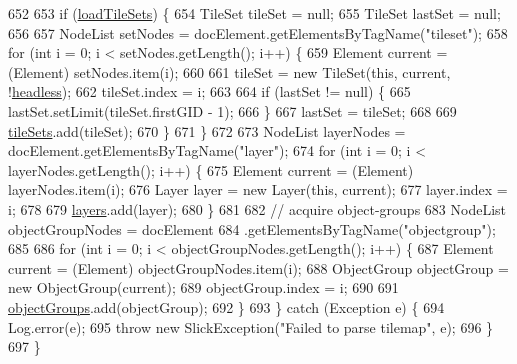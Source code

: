 \begin{DoxyCode}
652 
653             \textcolor{keywordflow}{if} (\mbox{\hyperlink{classorg_1_1newdawn_1_1slick_1_1tiled_1_1_tiled_map_a49356f102a76e7845f6dfbd4c6b70b59}{loadTileSets}}) \{
654                 TileSet tileSet = null;
655                 TileSet lastSet = null;
656 
657                 NodeList setNodes = docElement.getElementsByTagName(\textcolor{stringliteral}{"tileset"});
658                 \textcolor{keywordflow}{for} (\textcolor{keywordtype}{int} i = 0; i < setNodes.getLength(); i++) \{
659                     Element current = (Element) setNodes.item(i);
660 
661                     tileSet = \textcolor{keyword}{new} TileSet(\textcolor{keyword}{this}, current, !\mbox{\hyperlink{classorg_1_1newdawn_1_1slick_1_1tiled_1_1_tiled_map_aebbb5f7e7df93bc341d03b8bb55a2481}{headless}});
662                     tileSet.index = i;
663 
664                     \textcolor{keywordflow}{if} (lastSet != null) \{
665                         lastSet.setLimit(tileSet.firstGID - 1);
666                     \}
667                     lastSet = tileSet;
668 
669                     \mbox{\hyperlink{classorg_1_1newdawn_1_1slick_1_1tiled_1_1_tiled_map_a4fd72e23a7aaf6f85905f4bf78e2ce5f}{tileSets}}.add(tileSet);
670                 \}
671             \}
672 
673             NodeList layerNodes = docElement.getElementsByTagName(\textcolor{stringliteral}{"layer"});
674             \textcolor{keywordflow}{for} (\textcolor{keywordtype}{int} i = 0; i < layerNodes.getLength(); i++) \{
675                 Element current = (Element) layerNodes.item(i);
676                 Layer layer = \textcolor{keyword}{new} Layer(\textcolor{keyword}{this}, current);
677                 layer.index = i;
678 
679                 \mbox{\hyperlink{classorg_1_1newdawn_1_1slick_1_1tiled_1_1_tiled_map_a33061324d017a4cd8f41d04e0c60ac27}{layers}}.add(layer);
680             \}
681 
682             \textcolor{comment}{// acquire object-groups}
683             NodeList objectGroupNodes = docElement
684                     .getElementsByTagName(\textcolor{stringliteral}{"objectgroup"});
685 
686             \textcolor{keywordflow}{for} (\textcolor{keywordtype}{int} i = 0; i < objectGroupNodes.getLength(); i++) \{
687                 Element current = (Element) objectGroupNodes.item(i);
688                 ObjectGroup objectGroup = \textcolor{keyword}{new} ObjectGroup(current);
689                 objectGroup.index = i;
690 
691                 \mbox{\hyperlink{classorg_1_1newdawn_1_1slick_1_1tiled_1_1_tiled_map_aa446ef4b07ea80ab5f112e8512ed7561}{objectGroups}}.add(objectGroup);
692             \}
693         \} \textcolor{keywordflow}{catch} (Exception e) \{
694             Log.error(e);
695             \textcolor{keywordflow}{throw} \textcolor{keyword}{new} SlickException(\textcolor{stringliteral}{"Failed to parse tilemap"}, e);
696         \}
697     \}
\end{DoxyCode}
\mbox{\label{classorg_1_1newdawn_1_1slick_1_1tiled_1_1_tiled_map_a8958f06ac942b890600b3c7f92bfb9be}} 
